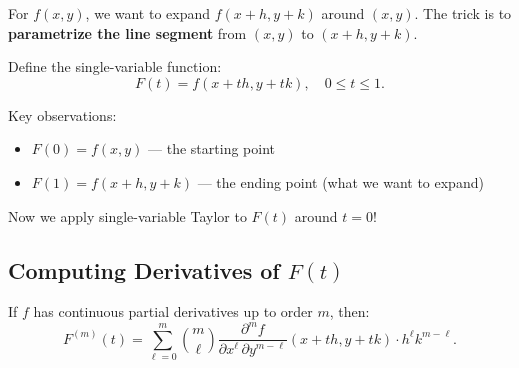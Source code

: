 \documentclass[11pt]{report}
\begin{document}
For $f(x, y)$, we want to expand $f(x + h, y + k)$ around $(x, y)$. The trick is to \textbf{parametrize the line segment} from $(x, y)$ to $(x + h, y + k)$.

Define the single-variable function:
\[
F(t) = f(x + th, y + tk), \quad 0 \leq t \leq 1.
\]

\begin{center}
\end{center}

Key observations:
\begin{itemize}[itemsep=2pt]
    \item $F(0) = f(x, y)$ — the starting point
    \item $F(1) = f(x + h, y + k)$ — the ending point (what we want to expand)
\end{itemize}

Now we apply single-variable Taylor to $F(t)$ around $t = 0$!

\subsection*{Computing Derivatives of $F(t)$}

\begin{theorem}[Derivatives of $F(t)$]
If $f$ has continuous partial derivatives up to order $m$, then:
\[
F^{(m)}(t) = \sum_{\ell=0}^{m} \binom{m}{\ell} \frac{\partial^m f}{\partial x^\ell \, \partial y^{m-\ell}}(x + th, y + tk) \cdot h^\ell k^{m-\ell}.
\]
\end{theorem}
\end{document}
